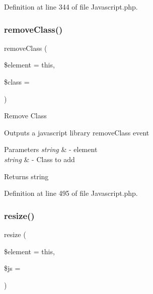 Definition at line 344 of file Javascript.\+php.

\mbox{\label{class_c_i___javascript_a909e52e0a7e3ddd7e6520965618d50f4}} 
\subsubsection{\texorpdfstring{removeClass()}{removeClass()}}
{\footnotesize\ttfamily remove\+Class (\begin{DoxyParamCaption}\item[{}]{\$element = {\ttfamily \textquotesingle{}this\textquotesingle{}},  }\item[{}]{\$class = {\ttfamily \textquotesingle{}\textquotesingle{}} }\end{DoxyParamCaption})}

Remove Class

Outputs a javascript library remove\+Class event


\begin{DoxyParams}{Parameters}
{\em string} & -\/ element \\
\hline
{\em string} & -\/ Class to add \\
\hline
\end{DoxyParams}
\begin{DoxyReturn}{Returns}
string 
\end{DoxyReturn}


Definition at line 495 of file Javascript.\+php.

\mbox{\label{class_c_i___javascript_a972b62f88e96fb29b179469e0d49329a}} 
\subsubsection{\texorpdfstring{resize()}{resize()}}
{\footnotesize\ttfamily resize (\begin{DoxyParamCaption}\item[{}]{\$element = {\ttfamily \textquotesingle{}this\textquotesingle{}},  }\item[{}]{\$js = {\ttfamily \textquotesingle{}\textquotesingle{}} }\end{DoxyParamCaption})}

